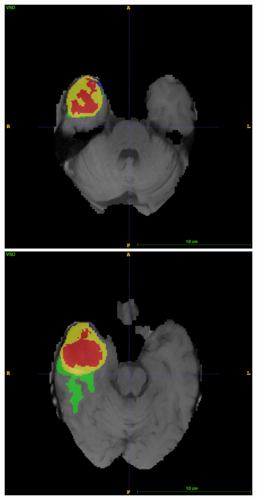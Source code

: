 \documentclass[12pt,a4paper,twoside,openright]{report}
\begin{document}
\begin{figure}
	\includegraphics[scale=0.1]{expert_segmentation_59}
	\includegraphics[scale=0.1]{expert_segmentation_69}

\end{figure}
\end{document}
